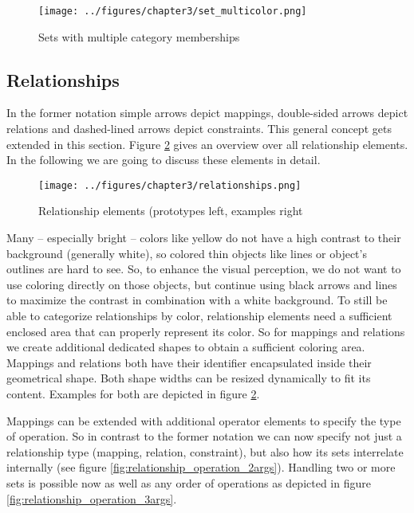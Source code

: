 \documentclass[twoside, openright, 12pt]{book}
\begin{document}
\begin{figure}[!h]
	\centering
	\texttt{[image: ../figures/chapter3/set\_multicolor.png]}
	\caption{Sets with multiple category memberships}
	\label{fig:set_multicolor}
\end{figure}



\subsection{Relationships}
\label{relationships}
In the former notation \citep{Amthor18} simple arrows depict mappings, double-sided arrows depict relations and dashed-lined arrows depict constraints.
This general concept gets extended in this section.
Figure \ref{fig:relationships} gives an overview over all relationship elements.
In the following we are going to discuss these elements in detail.

\begin{figure}[htb]
	\centering
	\texttt{[image: ../figures/chapter3/relationships.png]}
	\caption{Relationship elements (prototypes left, examples right}
	\label{fig:relationships}
\end{figure}

\noindent
Many -- especially bright -- colors like yellow do not have a high contrast to their background (generally white), so colored thin objects like lines or object's outlines are hard to see.
So, to enhance the visual perception, we do not want to use coloring directly on those objects, but continue using black arrows and lines to maximize the contrast in combination with a white background.
To still be able to categorize relationships by color, relationship elements need a sufficient enclosed area that can properly represent its color.
So for mappings and relations we create additional dedicated shapes to obtain a sufficient coloring area.
Mappings and relations both have their identifier encapsulated inside their geometrical shape.
Both shape widths can be resized dynamically to fit its content.
Examples for both are depicted in figure \ref{fig:relationships}.

Mappings can be extended with additional operator elements to specify the type of operation.
So in contrast to the former notation we can now specify not just a relationship type (mapping, relation, constraint), but also how its sets interrelate internally (see figure \ref{fig:relationship_operation_2args}).
Handling two or more sets is possible now as well as any order of operations as depicted in figure \ref{fig:relationship_operation_3args}.
\end{document}
